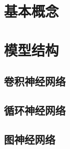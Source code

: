 \documentclass[11pt,oneside]{book}
\begin{document}


\tableofcontents

\part{基本概念}










\part{模型结构}
\chapter{卷积神经网络}





\chapter{循环神经网络}





\chapter{图神经网络}


\begin{appendices}
	
\end{appendices}
\end{document}
